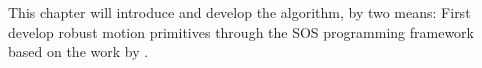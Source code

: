 This chapter will introduce and develop the \rrtfunnel{} algorithm, by two
means: First develop robust motion primitives through the \ac{SOS}
programming framework based on the work by
\cite{majumdarFunnelLibrariesRealtime2017}.
